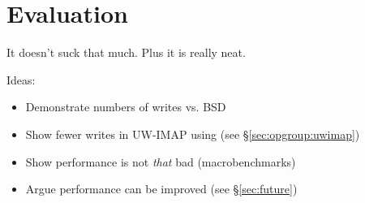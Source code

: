 \section {Evaluation}
\label{sec:evaluation}

It doesn't suck that much. Plus it is really neat.

Ideas:
\begin{itemize}
\item Demonstrate numbers of writes vs. BSD
\item Show fewer writes in UW-IMAP using \opgroups (see \S\ref{sec:opgroup:uwimap})
\item Show performance is not \emph{that} bad (macrobenchmarks)
\item Argue performance can be improved (see \S\ref{sec:future})
\end{itemize}
